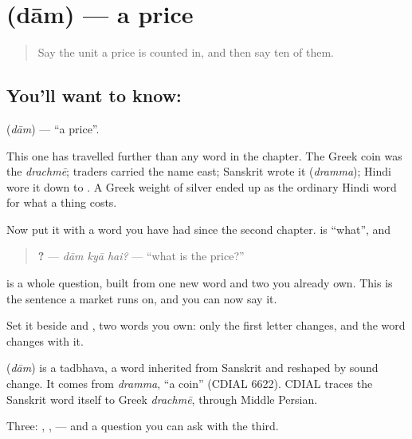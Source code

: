 \section[\texorpdfstring{\hi{दाम} (dām)}{दाम (dām)}]{ (dām) — a price}

\label{lesson:HI-C72-price}



\begin{quote}
Say the unit a price is counted in, and then say ten of them.
\end{quote}

\subsection*{You'll want to know: }
\textbf{} (\emph{dām}) — \textquotedblleft{}a price\textquotedblright{}.

This one has travelled further than any word in the chapter. The Greek coin was the \emph{drachmē}; traders carried the name east; Sanskrit wrote it  (\emph{dramma}); Hindi wore it down to . A Greek weight of silver ended up as the ordinary Hindi word for what a thing costs.

Now put it with a word you have had since the second chapter. \textbf{} is \textquotedblleft{}what\textquotedblright{}, and

\begin{quote}
\textbf{  ?} — \emph{dām kyā hai?} — \textquotedblleft{}what is the price?\textquotedblright{}
\end{quote}

is a whole question, built from one new word and two you already own. This is the sentence a market runs on, and you can now say it.

Set it beside \textbf{} and \textbf{}, two words you own: only the first letter changes, and the word changes with it.

\begin{cousinweb}
\textbf{} (\emph{dām}) is a tadbhava, a word inherited from Sanskrit and reshaped by sound change. It comes from \emph{dramma}, \textquotedblleft{}a coin\textquotedblright{} (CDIAL 6622). CDIAL traces the Sanskrit word itself to Greek \emph{drachmē}, through Middle Persian.
\end{cousinweb}

\begin{grammarlens}[title={What you've built}]
Three: , ,  — and a question you can ask with the third.
\end{grammarlens}

